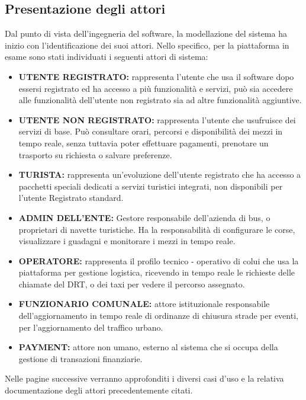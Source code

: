 \subsection*{Presentazione degli attori }
Dal punto di vista dell'ingegneria del software, la modellazione del sistema ha inizio con l'identificazione dei suoi attori. Nello specifico, per la piattaforma in esame sono stati individuati i seguenti attori di sistema:
\begin{itemize}
    \item \textbf{UTENTE REGISTRATO:} rappresenta l’utente che usa il software dopo essersi registrato ed ha accesso a più funzionalità e servizi, può sia accedere alle funzionalità dell’utente non registrato sia ad altre funzionalità aggiuntive.
    \item \textbf{UTENTE NON REGISTRATO:} rappresenta l’utente che usufruisce dei servizi di base. Può consultare orari, percorsi e disponibilità dei mezzi in tempo reale, senza tuttavia poter effettuare pagamenti, prenotare un trasporto su richiesta o salvare preferenze.
    \item \textbf{TURISTA:} rappresenta un’evoluzione dell’utente registrato che ha accesso a pacchetti speciali dedicati a servizi turistici integrati, non disponibili per l’utente Registrato standard.
    \item \textbf{ADMIN DELL'ENTE:} Gestore responsabile dell’azienda di bus, o proprietari di navette turistiche. Ha la responsabilità di configurare le corse, visualizzare i guadagni e monitorare i mezzi in tempo reale.
    \item \textbf{OPERATORE:} rappresenta il profilo tecnico - operativo di colui che usa la piattaforma per gestione logistica, ricevendo in tempo reale le richieste delle chiamate del DRT, o dei taxi per vedere il percorso assegnato.
    \item \textbf{FUNZIONARIO COMUNALE:} attore istituzionale responsabile dell’aggiornamento in tempo reale di ordinanze di chiusura strade per eventi, per l’aggiornamento del traffico urbano.
    \item \textbf{PAYMENT:} attore non umano, esterno al sistema che si occupa della gestione di transazioni finanziarie.
\end{itemize}
Nelle pagine successive verranno approfonditi i diversi casi d’uso e la relativa documentazione degli attori precedentemente citati.